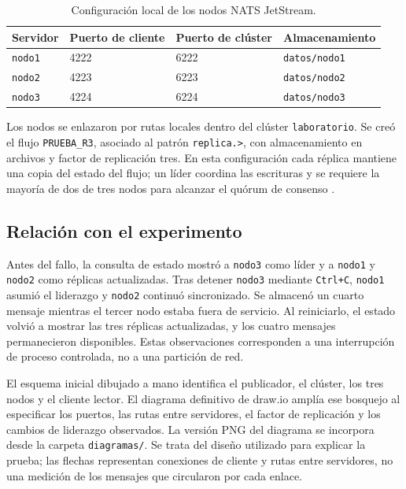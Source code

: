 \documentclass[12pt,a4paper]{article}
\begin{document}
\begin{table}[H]
\centering
\caption{Configuración local de los nodos NATS JetStream.}
\begin{tabular}{@{}llll@{}}
\toprule
Servidor & Puerto de cliente & Puerto de clúster & Almacenamiento \\ \midrule
\texttt{nodo1} & 4222 & 6222 & \texttt{datos/nodo1} \\
\texttt{nodo2} & 4223 & 6223 & \texttt{datos/nodo2} \\
\texttt{nodo3} & 4224 & 6224 & \texttt{datos/nodo3} \\ \bottomrule
\end{tabular}
\label{tab:nodos}
\end{table}

Los nodos se enlazaron por rutas locales dentro del clúster \texttt{laboratorio}. Se creó el flujo \texttt{PRUEBA\_R3}, asociado al patrón \texttt{replica.>}, con almacenamiento en archivos y factor de replicación tres. En esta configuración cada réplica mantiene una copia del estado del flujo; un líder coordina las escrituras y se requiere la mayoría de dos de tres nodos para alcanzar el quórum de consenso \cite{natsclustering}.

\subsection{Relación con el experimento}
Antes del fallo, la consulta de estado mostró a \texttt{nodo3} como líder y a \texttt{nodo1} y \texttt{nodo2} como réplicas actualizadas. Tras detener \texttt{nodo3} mediante \texttt{Ctrl+C}, \texttt{nodo1} asumió el liderazgo y \texttt{nodo2} continuó sincronizado. Se almacenó un cuarto mensaje mientras el tercer nodo estaba fuera de servicio. Al reiniciarlo, el estado volvió a mostrar las tres réplicas actualizadas, y los cuatro mensajes permanecieron disponibles. Estas observaciones corresponden a una interrupción de proceso controlada, no a una partición de red.

El esquema inicial dibujado a mano identifica el publicador, el clúster, los tres nodos y el cliente lector. El diagrama definitivo de draw.io amplía ese bosquejo al especificar los puertos, las rutas entre servidores, el factor de replicación y los cambios de liderazgo observados. La versión PNG del diagrama se incorpora desde la carpeta \texttt{diagramas/}. Se trata del diseño utilizado para explicar la prueba; las flechas representan conexiones de cliente y rutas entre servidores, no una medición de los mensajes que circularon por cada enlace.
\end{document}
